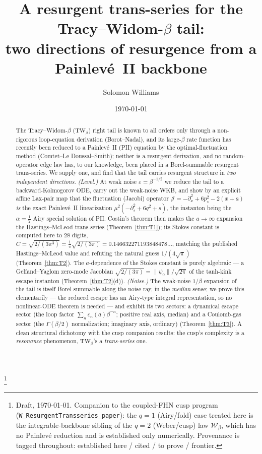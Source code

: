 \documentclass[11pt,reqno]{amsart}
\theoremstyle{plain}
\theoremstyle{definition}
\theoremstyle{remark}
\newcommand{\TW}{\mathrm{TW}_\beta}
\newcommand{\eps}{\varepsilon}
\newcommand{\pinst}{p_\star}
\begin{document}
\title[A resurgent trans-series for the Tracy--Widom-$\beta$ tail]{A resurgent trans-series for
the Tracy--Widom-$\beta$ tail:\\ two directions of resurgence from a Painlev\'e~II backbone}
\author{Solomon Williams}
\address{School of Mathematics, University of Edinburgh, Edinburgh EH9 3FD, United Kingdom}
\thanks{Draft, \today. Companion to the coupled-FHN cusp program
(\texttt{W\_ResurgentTransseries\_paper}): the $q{=}1$ (Airy/fold) case treated here is the
integrable-backbone sibling of the $q{=}2$ (Weber/cusp) law $\mathcal W_\beta$, which has no
Painlev\'e reduction and is established only numerically. Provenance is tagged throughout:
\textsf{established here} / \textsf{cited} / \textsf{to prove} / \textsf{frontier}.}
\date{\today}

\begin{abstract}
The Tracy--Widom-$\beta$ ($\TW$) right tail is known to all orders only through a non-rigorous
loop-equation derivation (Borot--Nadal), and its large-$\beta$ rate function has recently been
reduced to a Painlev\'e~II (PII) equation by the optimal-fluctuation method (Comtet--Le
Doussal--Smith); neither is a resurgent derivation, and no random-operator edge law has, to our
knowledge, been placed in a Borel-summable resurgent trans-series. We supply one, and find that the tail carries
resurgent structure in \emph{two independent directions}. \emph{(Level.)} At weak noise
$\eps=\beta^{-1/2}$ we reduce the tail to a backward-Kolmogorov ODE, carry out the weak-noise WKB,
and show by an explicit affine Lax-pair map that the fluctuation (Jacobi) operator
$\mathcal J=-\partial_x^2+6\pinst^2-2(x+a)$ \emph{is} the exact Painlev\'e~II linearization
$\mu^2(-\partial_s^2+6q^2+s)$, the instanton being the $\alpha=\tfrac12$ Airy special solution of
PII. Costin's theorem then makes the $a\to\infty$ expansion the Hastings--McLeod trans-series
(Theorem~\ref{thm:T1}); its Stokes constant is computed here to $28$ digits,
$C=\sqrt{2/(3\pi^3)}=\tfrac1\pi\sqrt{2/(3\pi)}=0.146632271193848478\ldots$, matching the published
Hastings--McLeod value and refuting the natural guess $1/(4\sqrt\pi)$ (Theorem~\ref{thm:T2}). The
$a$-dependence of the Stokes constant is purely algebraic --- a Gelfand--Yaglom zero-mode Jacobian
$\sqrt{2/(3\pi)}=\lVert\psi_0\rVert/\sqrt{2\pi}$ of the tanh-kink escape instanton
(Theorem~\ref{thm:T2}(d)). \emph{(Noise.)} The weak-noise $1/\beta$ expansion of the tail
is itself Borel summable along the noise ray, in the \emph{median} sense; we prove this elementarily
--- the reduced escape has an Airy-type integral representation, so no nonlinear-ODE theorem is
needed --- and exhibit its two sectors: a dynamical escape sector (the loop factor
$\sum_n c_n(a)\beta^{-n}$; positive real axis, median) and a Coulomb-gas sector (the $\Gamma(\beta/2)$
normalization; imaginary axis, ordinary) (Theorem~\ref{thm:T3}). A clean structural dichotomy with the cusp companion results: the cusp's
complexity is a \emph{resonance} phenomenon, $\TW$'s a \emph{trans-series} one.
\end{abstract}
\end{document}
